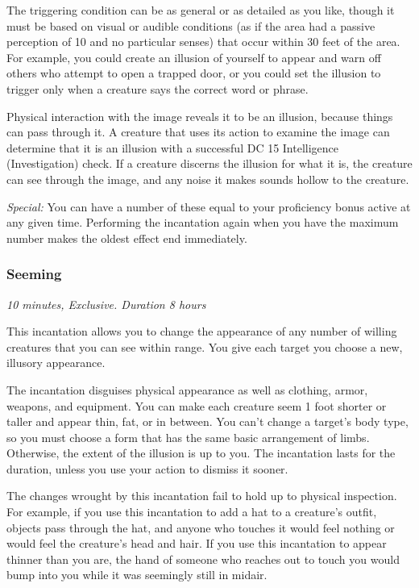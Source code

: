 The triggering condition can be as general or as detailed as you like, though it must be based on visual or audible conditions (as if the area had a passive perception of 10 and no particular senses) that occur within 30 feet of the area. For example, you could create an illusion of yourself to appear and warn off others who attempt to open a trapped door, or you could set the illusion to trigger only when a creature says the correct word or phrase.

Physical interaction with the image reveals it to be an illusion, because things can pass through it. A creature that uses its action to examine the image can determine that it is an illusion with a successful DC 15 Intelligence (Investigation) check. If a creature discerns the illusion for what it is, the creature can see through the image, and any noise it makes sounds hollow to the creature.

\textit{Special:} You can have a number of these equal to your proficiency bonus active at any given time. Performing the incantation again when you have the maximum number makes the oldest effect end immediately.

\label{spell:seeming}
\subsubsection{Seeming}
\textit{10 minutes, Exclusive. Duration 8 hours}

This incantation allows you to change the appearance of any number of willing creatures that you can see within range. You give each target you choose a new, illusory appearance. 

The incantation disguises physical appearance as well as clothing, armor, weapons, and equipment. You can make each creature seem 1 foot shorter or taller and appear thin, fat, or in between. You can't change a target's body type, so you must choose a form that has the same basic arrangement of limbs. Otherwise, the extent of the illusion is up to you. The incantation lasts for the duration, unless you use your action to dismiss it sooner.

The changes wrought by this incantation fail to hold up to physical inspection. For example, if you use this incantation to add a hat to a creature's outfit, objects pass through the hat, and anyone who touches it would feel nothing or would feel the creature's head and hair. If you use this incantation to appear thinner than you are, the hand of someone who reaches out to touch you would bump into you while it was seemingly still in midair.

